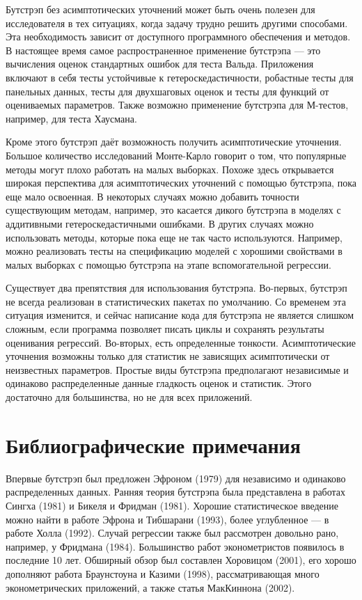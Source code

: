 Бутстрэп без асимптотических уточнений может быть очень полезен для исследователя в тех ситуациях, когда задачу трудно решить другими способами. 
Эта необходимость зависит от доступного программного обеспечения и методов. 
В настоящее время самое распространенное применение бутстрэпа --- это вычисления оценок стандартных ошибок для теста Вальда. 
Приложения включают в себя тесты устойчивые к гетероскедастичности, робастные тесты для панельных данных, тесты для двухшаговых оценок и тесты для функций от оцениваемых параметров.
Также возможно применение бутстрэпа для М-тестов, например, для теста Хаусмана.

Кроме этого бутстрэп даёт возможность получить асимптотические уточнения.
Большое количество исследований Монте-Карло говорит о том, что популярные методы могут плохо работать на малых выборках.
Похоже здесь открывается широкая перспектива для асимптотических уточнений с помощью бутстрэпа, пока еще мало освоенная.
В некоторых случаях можно добавить точности существующим методам, например, это касается дикого бутстрэпа в моделях с аддитивными гетероскедастичными ошибками.
В других случаях можно использовать методы, которые пока еще не так часто используются.
Например, можно реализовать тесты на спецификацию моделей с хорошими свойствами в малых выборках с помощью бутстрэпа на этапе вспомогательной регрессии.

Существует два препятствия для использования бутстрэпа.
Во-первых, бутстрэп не всегда реализован в статистических пакетах по умолчанию.
Со временем эта ситуация изменится, и сейчас написание кода для бутстрэпа не является слишком сложным, если программа позволяет писать циклы и сохранять результаты оценивания регрессий.
Во-вторых, есть определенные тонкости.
Асимптотические уточнения возможны только для статистик не зависящих асимптотически от неизвестных параметров.
Простые виды бутстрэпа предполагают независимые и одинаково распределенные данные гладкость оценок и статистик. 
Этого достаточно для большинства, но не для всех приложений.


\section{Библиографические примечания}

Впервые бутстрэп был предложен Эфроном (1979) для независимо и одинаково распределенных данных. Ранняя теория бутстрэпа была представлена в работах Сингха (1981) и Бикеля и Фридман (1981). Хорошие статистическое введение можно найти в работе Эфрона и Тибшарани (1993), более углубленное --- в работе Холла (1992). Случай регрессии также был рассмотрен довольно рано, например,  у Фридмана (1984). Большинство  работ эконометристов появилось в последние 10 лет. Обширный обзор был составлен Хоровицом (2001), его хорошо дополняют работа Браунстоуна и Казими (1998), рассматривающая много эконометрических приложений, а также статья МакКиннона (2002).


